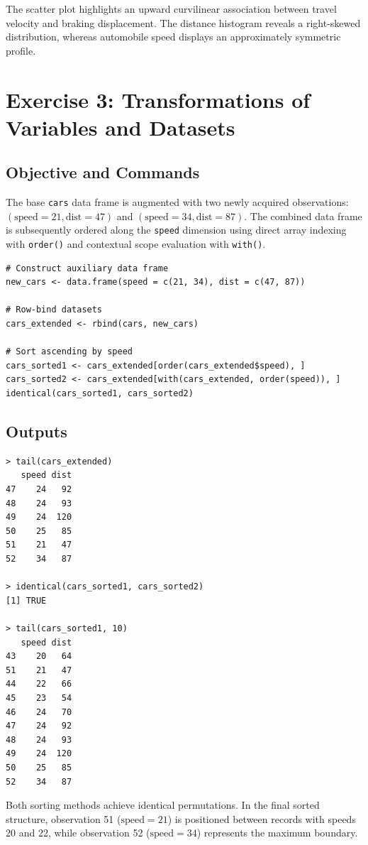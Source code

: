 \documentclass[11pt,a4paper]{article}
\begin{document}
The scatter plot highlights an upward curvilinear association between travel velocity and braking displacement. The distance histogram reveals a right-skewed distribution, whereas automobile speed displays an approximately symmetric profile.

\section{Exercise 3: Transformations of Variables and Datasets}

\subsection{Objective and Commands}
The base \texttt{cars} data frame is augmented with two newly acquired observations: $(\text{speed}=21, \text{dist}=47)$ and $(\text{speed}=34, \text{dist}=87)$. The combined data frame is subsequently ordered along the \texttt{speed} dimension using direct array indexing with \texttt{order()} and contextual scope evaluation with \texttt{with()}.

\begin{lstlisting}
# Construct auxiliary data frame
new_cars <- data.frame(speed = c(21, 34), dist = c(47, 87))

# Row-bind datasets
cars_extended <- rbind(cars, new_cars)

# Sort ascending by speed
cars_sorted1 <- cars_extended[order(cars_extended$speed), ]
cars_sorted2 <- cars_extended[with(cars_extended, order(speed)), ]
identical(cars_sorted1, cars_sorted2)
\end{lstlisting}

\subsection{Outputs}
\begin{lstlisting}[language={}]
> tail(cars_extended)
   speed dist
47    24   92
48    24   93
49    24  120
50    25   85
51    21   47
52    34   87

> identical(cars_sorted1, cars_sorted2)
[1] TRUE

> tail(cars_sorted1, 10)
   speed dist
43    20   64
51    21   47
44    22   66
45    23   54
46    24   70
47    24   92
48    24   93
49    24  120
50    25   85
52    34   87
\end{lstlisting}
Both sorting methods achieve identical permutations. In the final sorted structure, observation 51 ($\text{speed}=21$) is positioned between records with speeds 20 and 22, while observation 52 ($\text{speed}=34$) represents the maximum boundary.
\end{document}

